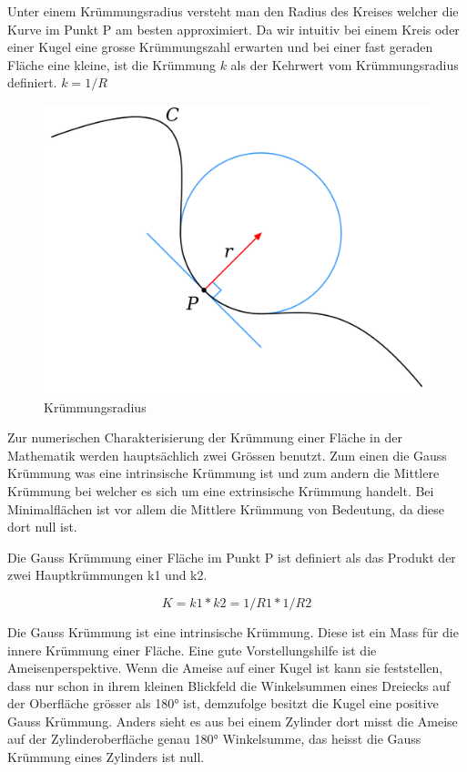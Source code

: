 \begin{refsection}
Unter einem Krümmungsradius versteht man den Radius des Kreises welcher die Kurve im Punkt P am besten approximiert. 
Da wir intuitiv bei einem Kreis oder einer Kugel eine grosse Krümmungszahl erwarten und bei einer fast geraden Fläche eine kleine, ist die Krümmung $k$  als der Kehrwert vom Krümmungsradius definiert. $k=1/R$ 

\begin{figure} [H]
  \centering
  \includegraphics[scale=0.1]{minimal/Kruemmungsradius.png}
  \caption{Krümmungsradius} 
\end{figure}


Zur numerischen Charakterisierung der Krümmung einer Fläche in der Mathematik werden hauptsächlich zwei Grössen benutzt.
Zum einen die Gauss Krümmung was eine intrinsische Krümmung ist und zum andern die Mittlere Krümmung bei welcher es sich um eine extrinsische Krümmung handelt. Bei Minimalflächen ist vor allem die Mittlere Krümmung von Bedeutung, da diese dort null ist.


Die Gauss Krümmung einer Fläche im Punkt P ist definiert als das Produkt der zwei Hauptkrümmungen k1 und k2.

\begin{equation} \label{Gauss_Krümmung_D}
  K=k1*k2=1/R1*1/R2
\end{equation}



Die Gauss Krümmung ist eine intrinsische Krümmung. Diese ist  ein Mass für die innere Krümmung einer Fläche. 
Eine gute Vorstellungshilfe ist die Ameisenperspektive. 
Wenn die Ameise auf einer Kugel ist kann sie feststellen, dass nur schon in ihrem kleinen Blickfeld die Winkelsummen eines Dreiecks auf der Oberfläche grösser als 180° ist, demzufolge besitzt die Kugel eine positive Gauss Krümmung. Anders sieht es aus bei einem Zylinder dort misst die Ameise auf der Zylinderoberfläche genau 180° Winkelsumme, das heisst die Gauss Krümmung eines Zylinders ist null.


\end{refsection}
